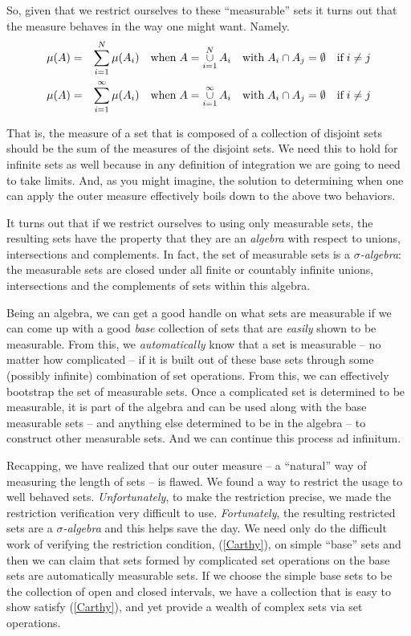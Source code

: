 \documentclass{article}
\begin{document}
So, given that we restrict ourselves to these ``measurable'' sets it turns out that
the measure behaves in the way one might want. Namely.
\begin{eqnarray*}
	\mu(A) & = & \sum_{i=1}^N\limits \mu(A_i) \quad \text{when} \; 
		A = \mathop{\cup}_{i=1}^N\limits A_i \quad \text{with} \;  
		A_i \cap A_j = \emptyset \quad \text{if} \; i \neq j \\
	\mu(A) & = & \sum_{i=1}^\infty\limits \mu(A_i) \quad \text{when} \; 
		A = \mathop{\cup}_{i=1}^\infty\limits A_i \quad \text{with} \; 
		A_i \cap A_j = \emptyset \quad \text{if} \; i \neq j
\end{eqnarray*}

That is, the measure of a set that is composed of a collection of disjoint 
sets should be the sum of the measures of the disjoint sets. We need this to hold
for infinite sets as well because in any definition of integration we are going 
to need to take limits.
And, as you might imagine, the solution to determining when one can apply the 
outer measure effectively boils down to the above two behaviors.

It turns out that if we restrict ourselves to using only measurable sets, 
the resulting sets have the property that they are an 
{\em algebra\/} with respect to unions, intersections and complements. 
In fact, the set of measurable sets is a {\em $\sigma$-algebra\/}:
the measurable sets are closed under all finite or countably infinite unions, 
intersections and the complements of sets within this algebra.

Being an algebra, we can get a good handle on what sets are measurable if we 
can come up with a good {\em base\/} collection of sets that are {\em easily\/} shown
to be measurable. From this, we {\em automatically\/} know that a set is measurable 
-- no matter how complicated -- if it is built out of these base sets
through some (possibly infinite) combination of set operations.
From this, we can effectively bootstrap the set of measurable sets.
Once a complicated set is determined to be measurable, it is part of the 
algebra and can be used along with the base measurable sets -- and anything 
else determined to be in the algebra -- to construct other measurable sets. 
And we can continue this process ad infinitum.

Recapping, we have realized that our outer measure -- a ``natural'' way of 
measuring the length of sets -- is flawed. We found a way to restrict the 
usage to well behaved sets. {\em Unfortunately\/}, to make the restriction precise, 
we made the restriction verification very difficult to use. {\em Fortunately\/}, 
the resulting restricted sets are a {\em $\sigma$-algebra\/} and this helps 
save the day. We need only do the difficult work of verifying the restriction 
condition, (\ref{Carthy}), on simple ``base'' sets and then we can claim that 
sets formed by complicated set operations on the base sets are automatically 
measurable sets. If we choose the simple base sets 
to be the collection of open and closed intervals, we have a collection that 
is easy to show satisfy (\ref{Carthy}), and yet provide a wealth of complex sets
via set operations.
\end{document}

